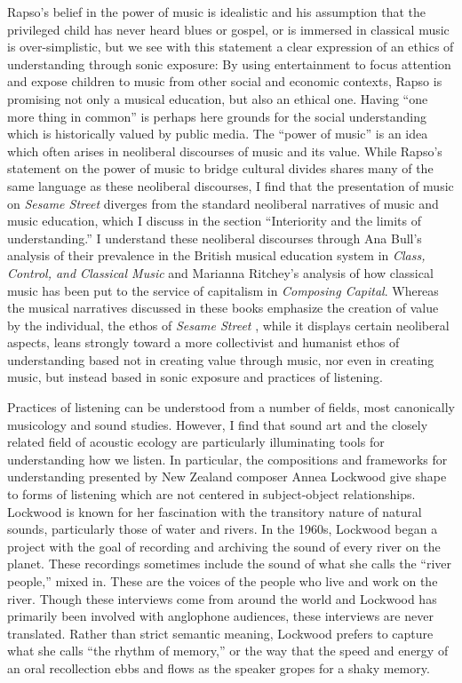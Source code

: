 \documentclass[12pt,letterpaper]{article}
\newcommand{\ses}{\textit{Sesame Street }}
\begin{document}
	Rapso's belief in the power of music is idealistic and his assumption
	that the privileged child has never heard blues or gospel, or is 
	immersed in classical music is over-simplistic, but we see with this 
	statement a clear expression of
	an ethics of understanding through sonic exposure: 
	By using entertainment to focus attention and expose children to music 
	from other social and economic contexts,
	Rapso is promising not only a musical education, but also an ethical 
	one. Having ``one more thing in common'' is perhaps here grounds for 
	the social understanding which is historically valued by public media.  
	The ``power of music'' is an idea which often arises in neoliberal 
	discourses of music and its value. While Rapso's statement on the power
	of music to bridge cultural divides shares many of the same language
	as these neoliberal  discourses, I find that the presentation of music
	on \textit{Sesame Street} diverges from the standard neoliberal
	narratives of music and music education, which I discuss in the section
	``Interiority and the limits of understanding.'' I understand these 
	neoliberal discourses through
	Ana Bull's analysis of their prevalence in the British musical
	education system in \textit{Class, Control, and Classical Music} and
	Marianna Ritchey's analysis of how classical music has been put to the
	service of capitalism in \textit{Composing Capital}. Whereas the musical
	narratives discussed in these books emphasize the creation of 
	value by the individual, the ethos of \ses, while it displays certain
	neoliberal aspects, leans strongly toward a more collectivist and 
	humanist ethos of understanding based not in creating value through
	music, nor even in creating music, but instead 
	based in sonic exposure and practices of listening.  

	Practices of listening can be understood from a number of fields,
	most canonically musicology and sound studies. However, I find that 
	sound art and the closely related field of acoustic ecology are 
	particularly illuminating tools for understanding how we listen. 
	In particular, the compositions and frameworks for 
	understanding presented by New Zealand composer Annea Lockwood give 
	shape to forms of listening which are not centered in subject-object 
	relationships.	Lockwood is known for her 
	fascination with the transitory nature of natural sounds, particularly 
	those of water and rivers. In the 1960s, Lockwood began a project with
	the goal of recording and archiving the sound of every river on the 
	planet.\autocite[117]{Rodgers} These recordings sometimes include the 
	sound of what she calls the ``river people,'' mixed in. These are the 	
	voices of the people who live and work on the 
	river.\autocite[121]{Rodgers} Though these interviews come from around 	
	the world and Lockwood has primarily been involved with anglophone 
	audiences, these interviews are never translated. Rather than strict 
	semantic meaning, Lockwood prefers to capture what she calls ``the 
	rhythm of memory,'' or the way that the speed and energy of an oral 
	recollection ebbs and flows as the speaker gropes for a shaky 
	memory.\autocite[122]{Rodgers}  
\end{document}
